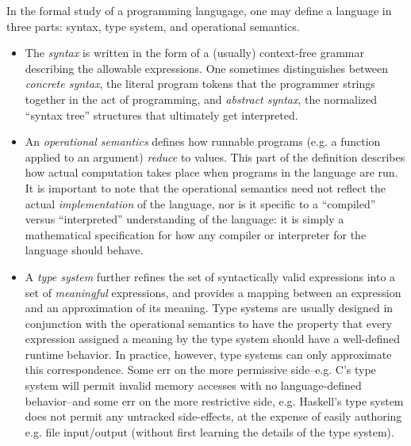 \newcommand{\param}[1]{\langle #1 \rangle}
\newcommand{\syn}[1]{\mathsf{#1}}


  In the formal study of a programming langugage, one may define a language
  in three parts: syntax, type system, and operational semantics.
  \begin{itemize}
    \item The {\em syntax} is written in the form of a (usually)
      context-free grammar describing the allowable expressions. One
      sometimes distinguishes between {\em concrete syntax}, the literal
      program tokens that the programmer strings together in the act of
      programming, and {\em abstract syntax}, the normalized ``syntax
      tree'' structures that ultimately get interpreted. 
    \item An {\em operational semantics} defines how runnable programs
      (e.g. a function applied to an argument) {\em reduce} to values. This
      part of the definition describes how actual computation takes place
      when programs in the language are run. It is important to note that
      the operational semantics need not reflect the actual {\em
      implementation} of the language, nor is it specific to a ``compiled''
      versus ``interpreted'' understanding of the language: it is simply a
      mathematical specification for how any compiler or interpreter for
      the language should behave.
    \item A {\em type system} further refines the set of syntactically
      valid expressions into a set of {\em meaningful} expressions, and provides
      a mapping between an expression and an approximation of its meaning.
      Type systems are usually designed in conjunction with the operational
      semantics to have the property that every expression assigned a
      meaning by the type system should have a well-defined runtime
      behavior. In practice, however, type systems can only approximate
      this correspondence. Some err on the more permissive side--e.g.
      C's type system will permit invalid memory accesses with no
      language-defined behavior--and some err on the more restrictive side,
      e.g. Haskell's type system does not permit any untracked
      side-effects, at the expense of easily authoring e.g. file input/output
      (without first learning the details of the type system).
  \end{itemize}
  
